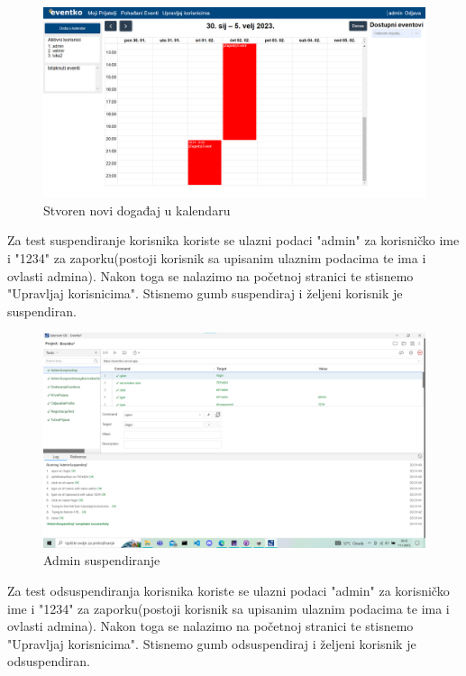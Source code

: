  			\begin{figure}[H]
 				\includegraphics[width=\textwidth]{Slike/Kalendar.png}
 				\caption{Stvoren novi događaj u kalendaru}
 			\end{figure}
 			
 			\indent Za test suspendiranje korisnika koriste se ulazni podaci "admin" za korisničko ime i "1234" za zaporku(postoji korisnik sa upisanim ulaznim podacima te ima i ovlasti admina). Nakon toga se nalazimo na početnoj stranici te stisnemo "Upravljaj korisnicima". Stisnemo gumb suspendiraj i željeni korisnik je suspendiran.
 			
 			\begin{figure}[H]
 				\includegraphics[width=\textwidth]{Slike/AdminSuspendirajSelenium.png}
 				\caption{Admin suspendiranje}
 			\end{figure}
 		
 		
 			\indent Za test odsuspendiranja korisnika koriste se ulazni podaci "admin" za korisničko ime i "1234" za zaporku(postoji korisnik sa upisanim ulaznim podacima te ima i ovlasti admina). Nakon toga se nalazimo na početnoj stranici te stisnemo "Upravljaj korisnicima". Stisnemo gumb odsuspendiraj i željeni korisnik je odsuspendiran.
 			
